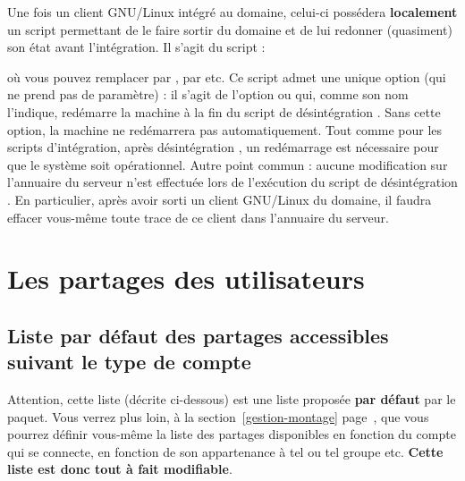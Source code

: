Une fois un client GNU/Linux intégré au domaine, celui-ci
possédera \textbf{localement} un script
permettant de le faire \og sortir \fg{} du domaine et de lui redonner (quasiment)
son état avant l'intégration. Il s'agit du script :
%
\begin{center}
\end{center}
%
où vous pouvez remplacer  par ,
par  etc. Ce script admet une unique option (qui ne
prend pas de paramètre) : il s'agit de l'option 
 ou  qui, comme
son nom l'indique, redémarre la machine à la fin du script de \og désintégration \fg{}.
Sans cette option, la machine ne redémarrera pas automatiquement. Tout comme pour
les scripts d'intégration, après \og désintégration \fg{}, un redémarrage est 
nécessaire pour que le système soit opérationnel. Autre point commun : aucune
modification sur l'annuaire du serveur n'est effectuée lors de l'exécution du
script de \og désintégration \fg{}. En particulier, après avoir \og sorti \fg{}
un client GNU/Linux du domaine,
il faudra effacer vous-même toute trace de ce client dans l'annuaire du serveur.






\section{Les partages des utilisateurs}


\subsection{Liste par défaut des partages accessibles suivant le type de compte}

Attention, cette liste (décrite ci-dessous)
est une liste proposée \textbf{par défaut} par le
paquet. Vous verrez plus loin, à la section~\ref{gestion-montage}
page~\pageref{gestion-montage}, que vous pourrez définir vous-même
la liste des partages disponibles en fonction du compte qui 
se connecte, en fonction de son appartenance à tel ou tel
groupe etc. \textbf{Cette liste est donc tout à fait modifiable}.

